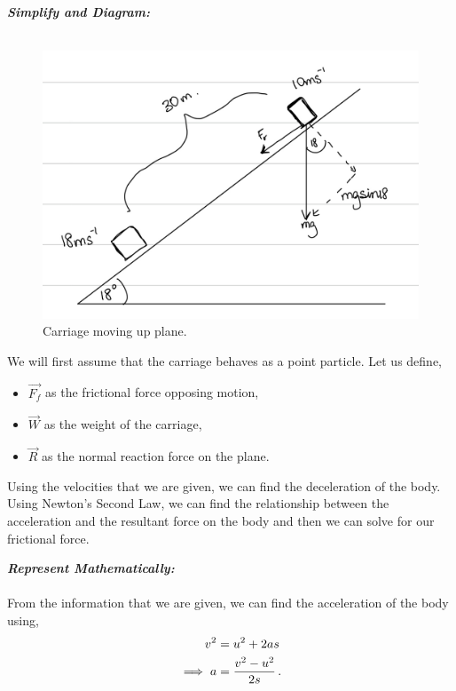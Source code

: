 \begin{subquestions}
\textbf{\textit{Simplify and Diagram:}} \\ \\
\begin{figure}[H]
	\begin{center}
		\includegraphics[scale=0.25]{../2013/figures/2013q5-2}
		\caption{\label{2013:q5:Diagram2} Carriage moving up plane.}
	\end{center}
\end{figure}
We will first assume that the carriage behaves as a point particle. Let us define,
\begin{itemize}
	\item $\vec{F_f}$ as the frictional force opposing motion,
	\item $\vec{W}$ as the weight of the carriage,
	\item $\vec{R}$ as the normal reaction force on the plane.
\end{itemize}
Using the velocities that we  are given, we can find the deceleration of the body. Using Newton's Second Law, we can find the relationship between the acceleration and the resultant force on the body and then we can solve for our frictional force.




\textbf{\textit{Represent Mathematically:}} \\ \\
From the information that we are given, we can find the acceleration of the body using,
\begin{align}
	v^2 & = u^2 + 2as \nonumber \\
	\implies a & = \frac{v^2-u^2}{2s} \,. \label{2013:q5:AEqn1}
\end{align}


\end{subquestions}
